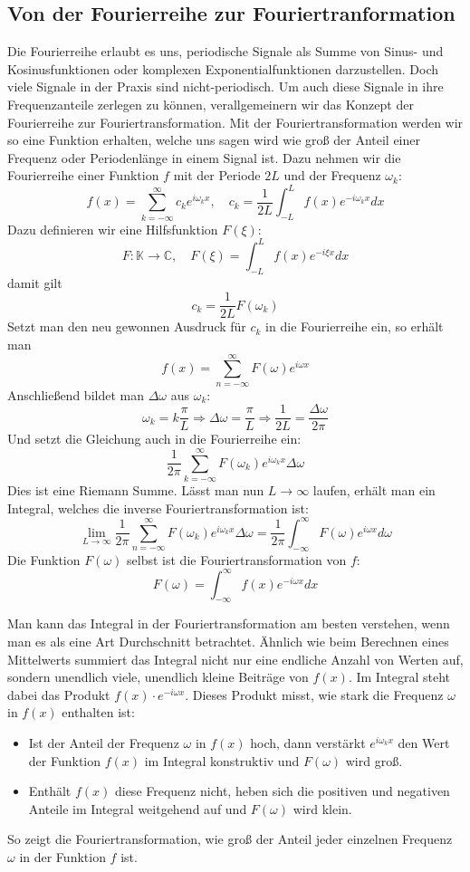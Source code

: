 \documentclass[a4paper,12pt]{article}
\theoremstyle{definition}
\theoremstyle{remark}
\begin{document}
\subsection{Von der Fourierreihe zur Fouriertranformation}
Die Fourierreihe erlaubt es uns, periodische Signale als Summe von Sinus- und Kosinusfunktionen oder komplexen Exponentialfunktionen darzustellen. Doch viele Signale in der Praxis sind nicht-periodisch. Um auch diese Signale in ihre Frequenzanteile zerlegen zu können, verallgemeinern wir das Konzept der Fourierreihe zur Fouriertransformation. Mit der Fouriertransformation werden wir so eine Funktion erhalten, welche uns sagen wird wie groß der Anteil einer Frequenz oder Periodenlänge in einem Signal ist. Dazu nehmen wir die Fourierreihe einer Funktion $f$ mit der Periode $2L$ und der Frequenz $\omega_k$: 
$$f(x) = \sum_{k = -\infty}^{\infty}{c_k e^{i\omega_k x} }, \quad c_k = \frac{1}{2L}\int_{-L}^L{f(x) e^{-i\omega_k x} dx}$$
Dazu definieren wir eine Hilfsfunktion $F(\xi)$: 
$$F:\mathbb{K} \to \mathbb{C}, \quad F(\xi) = \int_{-L}^{L}{f(x) e^{-i \xi x} dx}$$
damit gilt
$$ c_k = \frac{1}{2L} F(\omega_k)$$
Setzt man den neu gewonnen Ausdruck für $c_k$ in die Fourierreihe ein, so erhält man 
$$ f(x) = \sum_{n = -\infty}^{\infty}{F(\omega) e^{i\omega x}}$$
Anschließend bildet man $\Delta \omega$ aus $\omega_k$:
$$\omega_k = k \frac{\pi}{L} \Rightarrow \Delta \omega = \frac{\pi}{L} \Rightarrow \frac{1}{2L} = \frac{\Delta \omega} {2\pi}$$
Und setzt die Gleichung auch in die Fourierreihe ein: 
$$\frac{1}{2\pi} \sum_{k=-\infty}^{\infty}{F(\omega_k) e^{i \omega_k x} \Delta \omega}$$
Dies ist eine Riemann Summe. Lässt man nun $L \to \infty$ laufen, erhält man ein Integral, welches die inverse Fouriertransformation ist:
$$\lim_{L\to\infty} {\frac{1}{2\pi}\sum_{n = -\infty}^\infty{F(\omega_k) e^{i \omega_k x}\Delta \omega}} = \frac {1}{2\pi} \int_{-\infty}^{\infty}{F(\omega)e^{i \omega x} d\omega}$$
Die Funktion $F(\omega)$ selbst ist die Fouriertransformation von $f$:
$$F(\omega) = \int_{-\infty}^{\infty}{f(x) e^{-i\omega x} dx}$$

Man kann das Integral in der Fouriertransformation am besten verstehen, wenn man es 
als eine Art Durchschnitt betrachtet. Ähnlich wie beim Berechnen eines Mittelwerts 
summiert das Integral nicht nur eine endliche Anzahl von Werten auf, sondern unendlich viele, 
unendlich kleine Beiträge von $f(x)$. Im Integral steht dabei das Produkt $f(x) \cdot e^{-i\omega x}$.
Dieses Produkt misst, wie stark die Frequenz $\omega$ in $f(x)$ enthalten ist:
\begin{itemize}
    \item Ist der Anteil der Frequenz $\omega$ in $f(x)$ hoch, dann verstärkt $e^{i\omega_kx}$ den Wert der Funktion $f(x)$
    im Integral konstruktiv und $F(\omega)$ wird groß.
    \item Enthält $f(x)$ diese Frequenz nicht, heben sich die positiven und negativen Anteile 
    im Integral weitgehend auf und $F(\omega)$ wird klein.
  \end{itemize}
So zeigt die Fouriertransformation, wie groß der Anteil jeder einzelnen Frequenz $\omega$ 
in der Funktion $f$ ist.
\end{document}
